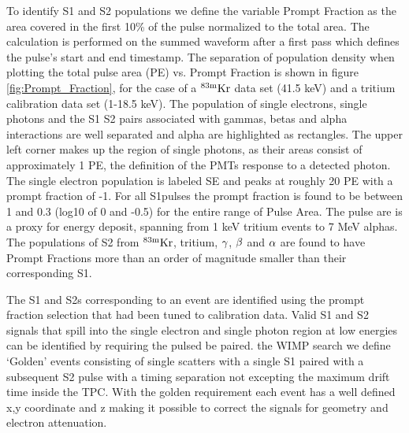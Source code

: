 To identify S1 and S2 populations we define the variable Prompt Fraction as the area covered in the first 10\% of the pulse normalized to the total area. The calculation is performed on the summed waveform after a first pass which defines the pulse's start and end timestamp. 
The separation of population density when plotting the total pulse area (PE) vs. Prompt Fraction is shown in figure \ref{fig:Prompt_Fraction},  for the case of a $\rm ^{83m}Kr$ data set (41.5 keV) and a tritium calibration data set (1-18.5 keV). The population of single electrons, single photons and the S1 S2 pairs associated with gammas, betas and alpha interactions are well separated and alpha are highlighted as rectangles. The upper left corner makes up the region of single photons, as their areas consist of approximately 1 PE, the definition of the PMTs response to a detected photon. The single electron population is labeled SE and peaks at roughly 20 PE with a prompt fraction of -1. For all S1pulses the prompt fraction is found to be between 1 and 0.3 (log10 of 0 and -0.5) for the entire range of Pulse Area. The pulse are is a proxy for energy deposit, spanning from 1 keV tritium events to 7 MeV alphas. The populations of S2 from $\rm^{83m}Kr$, tritium, $\rm \gamma$, $\rm \beta$ and $\rm \alpha$ are found to have Prompt Fractions more than an order of magnitude smaller than their corresponding S1. 


The S1 and S2s corresponding to an event are identified using the prompt fraction selection that had been tuned to calibration data. Valid S1 and S2 signals that spill into the single electron and single photon region at low energies can be identified by requiring the pulsed be paired.  the WIMP search we define `Golden' events consisting of single scatters with a single S1 paired with a subsequent S2 pulse with a timing separation not excepting the maximum drift time inside the TPC. With the golden requirement each event has a well defined x,y coordinate and z making it possible to correct the signals for geometry and electron attenuation. 


